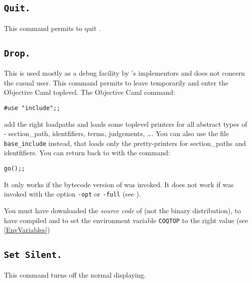 \subsection{\tt Quit.}
This command permits to quit \Coq.

\subsection{\tt Drop.}\label{Drop}

This is used mostly as a debug facility by \Coq's implementors
and does not concern the casual user.
This command permits to leave {\Coq} temporarily and enter the
Objective Caml toplevel. The Objective Caml command:

\begin{flushleft}
\begin{verbatim}
#use "include";;
\end{verbatim}
\end{flushleft}

\noindent add the right loadpaths and loads some toplevel printers for
all abstract types of \Coq - section\_path, identfifiers, terms, judgements,
\dots. You can also use the file \texttt{base\_include} instead,
that loads only the pretty-printers for section\_paths and
identfifiers.
You can return back to \Coq{} with the command: 

\begin{flushleft}
\begin{verbatim}
go();;
\end{verbatim}
\end{flushleft}

\begin{Warnings}
\item It only works if the bytecode version of {\Coq} was
invoked. It does not work if {\Coq} was invoked with the option 
{\tt -opt} or {\tt -full} (see \pageref{binary-images}).
\item You must have downloaded the \emph{source code} of \Coq{} (not the
  binary distribution), to have compiled \Coq{} and to set the
  environment variable \texttt{COQTOP} to the right value (see
  \ref{EnvVariables})
\end{Warnings}

\subsection{\tt Set Silent.}
\label{Begin-Silent}
This command turns off the normal displaying.

